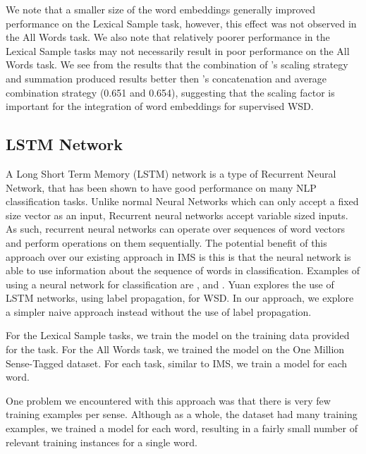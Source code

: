 We note that a smaller size of the word embeddings generally improved performance on the Lexical Sample task, however, this effect was not observed in the All Words task. We also note that relatively poorer performance in the Lexical Sample tasks may not necessarily result in poor performance on the All Words task. We see from the results that the combination of \cite{Taghipour15}'s scaling strategy and summation produced results better then \cite{Iacobacci2016}'s concatenation and average combination strategy (0.651 and 0.654), suggesting that the scaling factor is important for the integration of word embeddings for supervised WSD. 


\subsection{LSTM Network}

A Long Short Term Memory (LSTM) network is a type of Recurrent Neural Network, that has been shown to have good performance on many NLP classification tasks. Unlike normal Neural Networks which can only accept a fixed size vector as an input, Recurrent neural networks accept variable sized inputs. As such, recurrent neural networks can operate over sequences of word vectors and perform operations on them sequentially. The potential benefit of this approach over our existing approach in IMS is this is that the neural network is able to use information about the sequence of words in classification. Examples of using a neural network for classification are \cite{socher2011parsing}, and \cite{socher2013recursive}. Yuan  explores the use of LSTM networks, using label propagation, for WSD. In our approach, we explore a simpler naive approach instead without the use of label propagation.


For the Lexical Sample tasks, we train the model on the training data provided for the task. For the All Words task, we trained the model on the One Million Sense-Tagged dataset. For each task, similar to IMS, we train a model for each word. 

One problem we encountered with this approach was that there is very few training examples per sense. Although as a whole, the dataset had many training examples, we trained a model for each word, resulting in a fairly small number of relevant training instances for a single word. 





